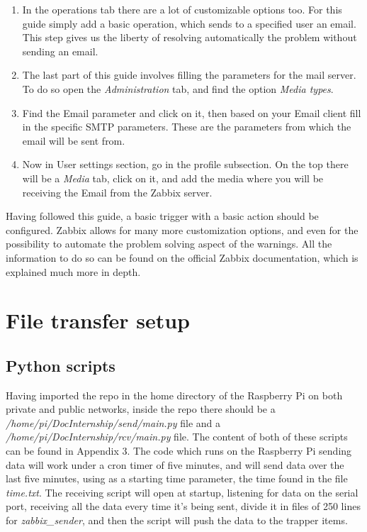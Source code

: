 \documentclass[a4paper,11pt]{scrartcl}
\begin{document}
\begin{enumerate}
    \item In the operations tab there are a lot of customizable options too. For this guide simply add a basic operation, which sends to a specified user an email. This step gives us the liberty of resolving automatically the problem without sending an email.
    \item The last part of this guide involves filling the parameters for the mail server. To do so open the \textit{Administration} tab, and find the option \textit{Media types}.
    \item Find the Email parameter and click on it, then based on your Email client fill in the specific SMTP parameters. These are the parameters from which the email will be sent from.
    \item Now in User settings section, go in the profile subsection. On the top there will be a \textit{Media} tab, click on it, and add the media where you will be receiving the Email from the Zabbix server.
\end{enumerate}
Having followed this guide, a basic trigger with a basic action should be configured. Zabbix allows for many more customization options, and even for the possibility to automate the problem solving aspect of the warnings. All the information to do so can be found on the official Zabbix documentation, which is explained much more in depth.

\section{File transfer setup}
\subsection{Python scripts}
Having imported the repo in the home directory of the Raspberry Pi on both private and public networks, inside the repo there should be a \textit{/home/pi/DocInternship/send/main.py} file and a \textit{/home/pi/DocInternship/rcv/main.py} file. The content of both of these scripts can be found in Appendix 3. The code which runs on the Raspberry Pi sending data will work under a cron timer of five minutes, and will send data over the last five minutes, using as a starting time parameter, the time found in the file \textit{time.txt}. The receiving script will open at startup, listening for data on the serial port, receiving all the data every time it's being sent, divide it in files of 250 lines for \textit{zabbix\_sender}, and then the script will push the data to the trapper items.  
\end{document}
